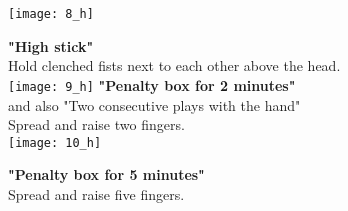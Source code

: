 \texttt{[image: 8\_h]}

\textbf{"High stick"}\\
Hold clenched fists next to each other above the head. \\ 


\texttt{[image: 9\_h]}
  \textbf{"Penalty box for 2 minutes"}\\ and also "Two consecutive plays with the hand"\\Spread and raise two fingers.  \\ 


\texttt{[image: 10\_h]}
  
\textbf{"Penalty box for 5 minutes"}\\ Spread and raise five fingers. \\ 
